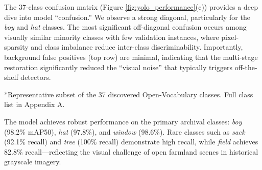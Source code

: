 \documentclass[12pt,onecolumn,a4paper]{IEEEtran}
\begin{document}
The 37-class confusion matrix (Figure \ref{fig:yolo_performance}(c)) provides a deep dive into model ``confusion.'' We observe a strong diagonal, particularly for the \textit{boy} and \textit{hat} classes. The most significant off-diagonal confusion occurs among visually similar minority classes with few validation instances, where pixel-sparsity and class imbalance reduce inter-class discriminability. Importantly, background false positives (top row) are minimal, indicating that the multi-stage restoration significantly reduced the ``visual noise'' that typically triggers off-the-shelf detectors.

\begin{table}[!htbp]
\centering
\caption{YOLOv11 Final v1.0: Per-Class Performance Metrics (37-Class Open-Vocabulary).}
\label{tab:per_class_performance}
\begin{flushleft}
\small{*Representative subset of the 37 discovered Open-Vocabulary classes. Full class list in Appendix A.}
\end{flushleft}
\end{table}

The model achieves robust performance on the primary archival classes: \textit{boy} (98.2\% mAP50), \textit{hat} (97.8\%), and \textit{window} (98.6\%). Rare classes such as \textit{sack} (92.1\% recall) and \textit{tree} (100\% recall) demonstrate high recall, while \textit{field} achieves 82.8\% recall—reflecting the visual challenge of open farmland scenes in historical grayscale imagery.
\end{document}
